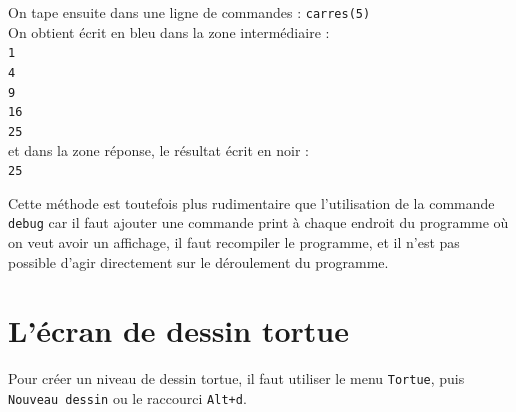 \documentclass[a4paper,11pt]{article}
\begin{document}
On tape ensuite dans une ligne de commandes :
{\tt carres(5)}\\
On obtient \'ecrit en bleu dans la zone interm\'ediaire :\\
{\tt 1\\
4\\
9\\
16\\
25}\\
et dans la zone r\'eponse, le r\'esultat \'ecrit en noir :\\
{\tt 25}

Cette m\'ethode est toutefois plus rudimentaire que l'utilisation de la
commande {\tt debug} car il faut ajouter une commande print \`a chaque
endroit du programme o\`u on veut avoir un affichage, il faut recompiler
le programme, et il n'est pas possible d'agir directement sur le
d\'eroulement du programme.

\section{L'\'ecran de dessin tortue}
Pour cr\'eer un niveau de dessin tortue, il faut utiliser le menu 
{\tt Tortue}, puis {\tt Nouveau dessin} ou le raccourci 
{\tt Alt+d}.
\end{document}
